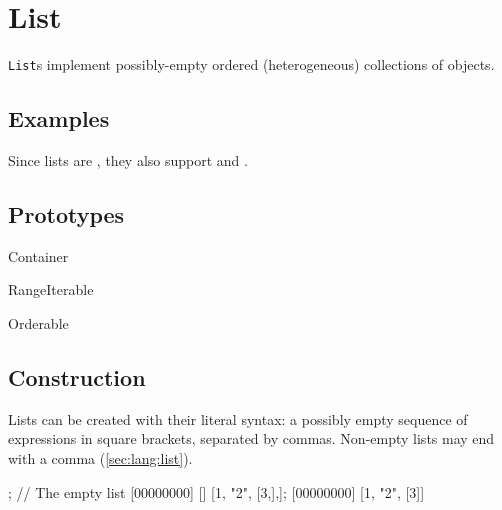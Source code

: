 
\section{List}

\lstinline|List|s implement possibly-empty ordered (heterogeneous)
collections of objects.

\subsection{Examples}

Since lists are , they also support
 and .



\subsection{Prototypes}

\begin{refObjects}
\item[Container]
\item[RangeIterable]
\item[Orderable]
\end{refObjects}

\subsection{Construction}

Lists can be created with their literal syntax: a possibly empty sequence of
expressions in square brackets, separated by commas.  Non-empty lists may
end with a comma (\autoref{sec:lang:list}).

\begin{urbiscript}
[]; // The empty list
[00000000] []
[1, "2", [3,],];
[00000000] [1, "2", [3]]
\end{urbiscript}

